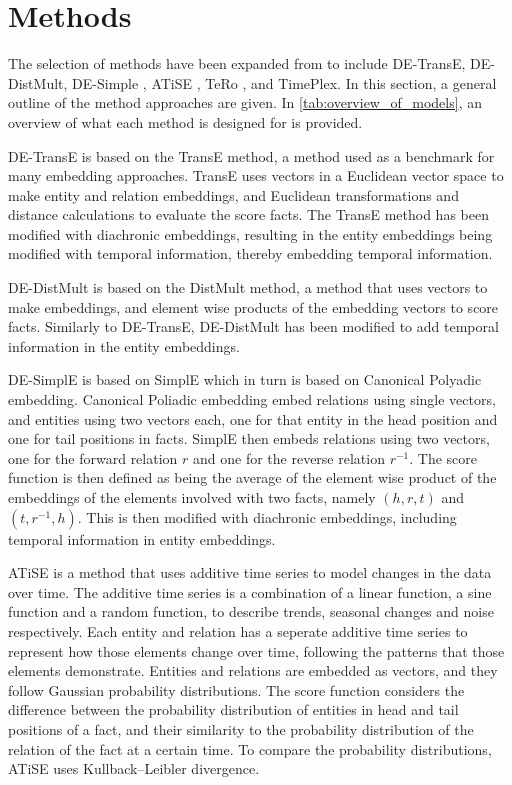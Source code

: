 \section{Methods}
\label{sec:methods}

The selection of methods have been expanded from \cite{P9} to include DE-TransE, DE-DistMult, DE-Simple \cite{goel19diachronicemb}, ATiSE \cite{xu19atise}, TeRo \cite{xu2020tero}, and TimePlex. In this section, a general outline of the method approaches are given. In \autoref{tab:overview_of_models}, an overview of what each method is designed for is provided.



DE-TransE is based on the TransE \cite{bordes2013transe} method, a method used as a benchmark for many embedding approaches. TransE uses vectors in a Euclidean vector space to make entity and relation embeddings, and Euclidean transformations and distance calculations to evaluate the score facts. The TransE method has been modified with diachronic embeddings, resulting in the entity embeddings being modified with temporal information, thereby embedding temporal information.

DE-DistMult is based on the DistMult \cite{yang2015distmult} method, a method that uses vectors to make embeddings, and element wise products of the embedding vectors to score facts. Similarly to DE-TransE, DE-DistMult has been modified to add temporal information in the entity embeddings.

DE-SimplE is based on SimplE \cite{kazemi2018simple} which in turn is based on Canonical Polyadic \cite{hitchcock1927cp} embedding. Canonical Poliadic embedding embed relations using single vectors, and entities using two vectors each, one for that entity in the head position and one for tail positions in facts. SimplE then embeds relations using two vectors, one for the forward relation $r$ and one for the reverse relation $r^{-1}$. The score function is then defined as being the average of the element wise product of the embeddings of the elements involved with two facts, namely $(h, r, t)$ and $(t, r^{-1}, h)$. This is then modified with diachronic embeddings, including temporal information in entity embeddings.

ATiSE is a method that uses additive time series to model changes in the data over time. The additive time series is a combination of a linear function, a sine function and a random function, to describe trends, seasonal changes and noise respectively. Each entity and relation has a seperate additive time series to represent how those elements change over time, following the patterns that those elements demonstrate. Entities and relations are embedded as vectors, and they follow Gaussian probability distributions. The score function considers the difference between the probability distribution of entities in head and tail positions of a fact, and their similarity to the probability distribution of the relation of the fact at a certain time. To compare the probability distributions, ATiSE uses Kullback–Leibler divergence.

